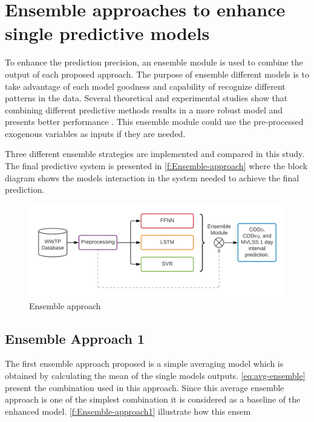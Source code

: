 \section{Ensemble approaches to enhance single predictive models}
\label{s:Ensembles}

To enhance the prediction precision, an ensemble module is used to combine the output of each proposed approach. The purpose of ensemble different models is to take advantage of each model goodness and capability of recognize different patterns in the data. Several theoretical and experimental studies show that combining different predictive methods results in a more robust model and presents better performance \cite{Nourani2021}. This ensemble module could use the pre-processed exogenous variables as inputs if they are needed.

Three different ensemble strategies are implemented and compared in this study. The final predictive system is presented in \autoref{f:Ensemble-approach} where the block diagram shows the models interaction in the system needed to achieve the final prediction. 

\begin{figure}[h]
\centering
\includegraphics[width=\linewidth]{figures/Ch5/Thesis-Approaches-Ensemble.png}
\caption{Ensemble approach}
\label{f:Ensemble-approach}
\end{figure}

\subsection{Ensemble Approach 1}
\label{s:Ensemble-Approach1}
The first ensemble approach proposed is a simple averaging model which is obtained by calculating the mean of the single models outputs. \autoref{eq:avg-ensemble} present the combination used in this approach. Since this average ensemble approach is one of the simplest combination it is considered as a baseline of the enhanced model. \autoref{f:Ensemble-approach1} illustrate how this ensem

